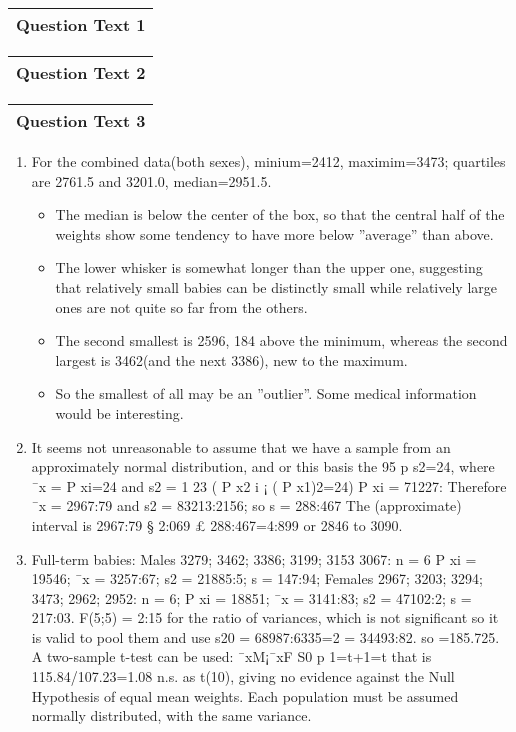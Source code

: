\documentclass[a4paper,12pt]{article}
\begin{document}
  \begin{table}[ht!]
     \centering
     \begin{tabular}{|p{15cm}|}
     \hline        
Question Text 1
\\ \hline
      \end{tabular}
    \end{table}
    
  \begin{table}[ht!]
     \centering
     \begin{tabular}{|p{15cm}|}
     \hline  
Question Text 2   
 \\ \hline 
      \end{tabular}
    \end{table}
  \begin{table}[ht!]
     \centering
     \begin{tabular}{|p{15cm}|}
     \hline  
Question Text 3 
\\ \hline
      \end{tabular}
    \end{table}
        
\begin{enumerate}
    \item For the combined data(both sexes), minium=2412, maximim=3473; quartiles are 2761.5
and 3201.0, median=2951.5.
\begin{itemize}
    \item The median is below the center of the box, so that the central half of the weights show
some tendency to have more below ”average” than above.
\item The lower whisker is somewhat
longer than the upper one, suggesting that relatively small babies can be distinctly small
while relatively large ones are not quite so far from the others.
\item The second smallest is 2596, 184 above the minimum, whereas the second largest is
3462(and the next 3386), new to the maximum. 
\item So the smallest of all may be an ”outlier”.
Some medical information would be interesting.
\end{itemize}

\item  It seems not unreasonable to assume that we have a sample from an approximately
normal distribution, and or this basis the 95%
p
s2=24,
where ¯x =
P
xi=24 and s2 = 1
23 (
P
x2
i ¡ (
P
x1)2=24)
P
xi = 71227:
Therefore ¯x = 2967:79 and s2 = 83213:2156; so s = 288:467 The (approximate) interval
is 2967:79 § 2:069 £ 288:467=4:899 or 2846 to 3090.
\item Full-term babies:
Males 3279; 3462; 3386; 3199; 3153 3067: n = 6
P
xi = 19546; ¯x = 3257:67; s2 =
21885:5; s = 147:94;
Females 2967; 3203; 3294; 3473; 2962; 2952: n = 6;
P
xi = 18851; ¯x = 3141:83; s2 =
47102:2; s = 217:03.
F(5;5) = 2:15 for the ratio of variances, which is not significant so it is valid to pool them
and use s20
= 68987:6335=2 = 34493:82. so =185.725.
A two-sample t-test can be used: ¯xM¡¯xF
S0
p
1=t+1=t
that is 115.84/107.23=1.08 n.s. as t(10),
giving no evidence against the Null Hypothesis of equal mean weights. Each population
must be assumed normally distributed, with the same variance.
\end{enumerate}
\end{document}
